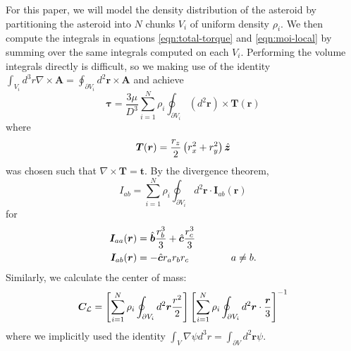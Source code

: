 \documentclass[aps,twocolumn,secnumarabic,balancelastpage,amsmath,amssymb,nofootinbib,floatfix]{revtex4-1}
\begin{document}
For this paper, we will model the density distribution of the asteroid by partitioning the asteroid into $N$ chunks $V_i$ of uniform density $\rho_i$. We then compute the integrals in equations \ref{eqn:total-torque} and \ref{eqn:moi-local} by summing over the same integrals computed on each $V_i$. Performing the volume integrals directly is difficult, so we making use of the identity $\int_{V_i} d^3 r \nabla \times \bm A = \oint_{\partial V_i} d^2 \bm r \times \bm A$
and achieve
\begin{equation}
    \bm \tau = \frac{3\mu}{D^3} \sum_{i=1}^N \rho_i\oint_{\partial V_i} (d^2 \bm r) \times \bm T(\bm r)
    \label{eqn:surface-torque}
\end{equation}
where 
\begin{equation}
    \bm T(\bm r) = \frac{r_z}{2}\left( r_x^2 + r_y^2 \right)\hat{\bm z}
    \label{eqn:torque-generator}
\end{equation}
was chosen such that $\nabla \times \bm T = \bm t$. By the divergence theorem,
\begin{equation}
    I_{ab} = \sum_{i=1}^N \rho_i\oint_{\partial V_i} d^2 \bm r \cdot \bm I_{ab}(\bm r)
    \label{eqn:surface-moi}
\end{equation}
for 
\begin{equation}
\begin{aligned}
    \bm I_{aa}(\bm r)& = \hat{\bm b} \frac{r_b^3}{3} + \hat{\bm c} \frac{r_c^3}{3} \\
    \bm I_{ab}(\bm r)& = -\hat{\bm c} r_a r_b r_c \hspace{1.5 cm} a \neq b
    \label{eqn:moi-generator}.
\end{aligned}
\end{equation}
Similarly, we calculate the center of mass:
\begin{equation}
    \bm C_\mathcal{L} = \left[ \sum_{i=1}^N \rho_i \oint_{\partial V_i}d^2 \bm r \frac{r^2}{2} \right]\left[ \sum_{i=1}^N \rho_i \oint_{\partial V_i}d^2 \bm r \cdot \frac{\bm r}{3} \right]^{-1}
    \label{eqn:com-surf}
\end{equation}
where we implicitly used the identity $\int_V \nabla \psi d^3 r = \int_{\partial V} d^2 \bm r \psi$.
\end{document}
